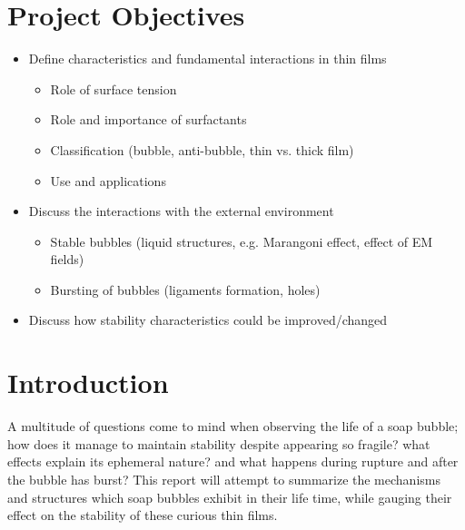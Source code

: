 \documentclass[a4paper,12pt]{article}
\numberwithin{equation}{section}
\numberwithin{figure}{section}
\numberwithin{table}{section}
\begin{document}
\setcounter{page}{2}
\newpage
\section*{Project Objectives}

\begin{itemize}
    \item Define characteristics and fundamental interactions in thin films
    \begin{itemize}
        \item Role of surface tension
		\item Role and importance of surfactants
		\item Classification (bubble, anti-bubble, thin vs. thick film)
		\item Use and applications
    \end{itemize}
    \item Discuss the interactions with the external environment
    \begin{itemize}
        \item Stable bubbles (liquid structures, e.g. Marangoni effect, effect of EM fields)
		\item Bursting of bubbles (ligaments formation, holes)
    \end{itemize}
     \item Discuss how stability characteristics could be improved/changed
\end{itemize}

\newpage
\tableofcontents


\newpage
\clearpage{}
\section{Introduction}

A multitude of questions come to mind when observing the life of a soap bubble; how does it manage to maintain stability despite appearing so fragile? what effects explain its ephemeral nature? and what happens during rupture and after the bubble has burst? This report will attempt to summarize the mechanisms and structures which soap bubbles exhibit in their life time, while gauging their effect on the stability of these curious thin films.
\end{document}
